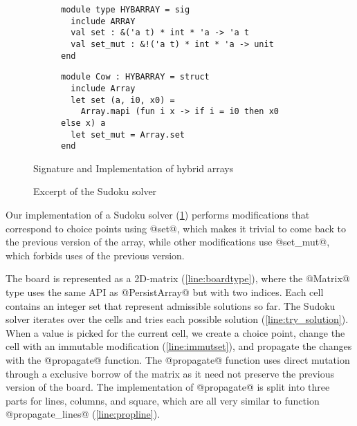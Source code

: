 \begin{figure}[tp]
  \centering
  \begin{subfigure}[t]{0.45\linewidth}
\begin{lstlisting}
module type HYBARRAY = sig
  include ARRAY
  val set : &('a t) * int * 'a -> 'a t
  val set_mut : &!('a t) * int * 'a -> unit
end
\end{lstlisting}
  \end{subfigure}\hfill
  \begin{subfigure}[t]{0.55\linewidth}
\begin{lstlisting}
module Cow : HYBARRAY = struct
  include Array
  let set (a, i0, x0) =
    Array.mapi (fun i x -> if i = i0 then x0 else x) a
  let set_mut = Array.set
end
\end{lstlisting}
  \end{subfigure}
  \vspace{-15pt}
  \caption{Signature and Implementation of hybrid arrays}
  \label{sig:hybarray}
  \label{ex:cow}

  \begin{subfigure}[t]{0.45\linewidth}
  
  \end{subfigure}\hfill
  \begin{subfigure}[t]{0.55\linewidth}
  
  \end{subfigure}
  \vspace{-15pt}
  \caption{Excerpt of the Sudoku solver}
  \label{ex:sudoku}
\end{figure}

Our implementation of a Sudoku solver (\cref{ex:sudoku}) performs
modifications that correspond to choice points using @set@,
which makes it trivial to come back to the previous version
of the array, while other modifications use @set_mut@, which
forbids uses of the previous version.

The board is represented as a 2D-matrix (\cref{line:boardtype}), where
the @Matrix@ type uses the same API as @PersistArray@
but with two indices.
Each cell contains an integer set that represent admissible solutions so far.
The Sudoku solver iterates over the cells and tries each possible solution (\cref{line:try_solution}).
When a value is picked for the current cell, we create a choice point,
change the cell with an immutable modification (\cref{line:immutset}), and propagate
the changes with the @propagate@ function.
The @propagate@ function uses direct mutation through a
exclusive borrow of the matrix as it need not preserve the previous
version of the board.
The implementation of @propagate@ is split into three parts
for lines, columns, and square, which are all very similar to function
@propagate_lines@ (\cref{line:propline}).

